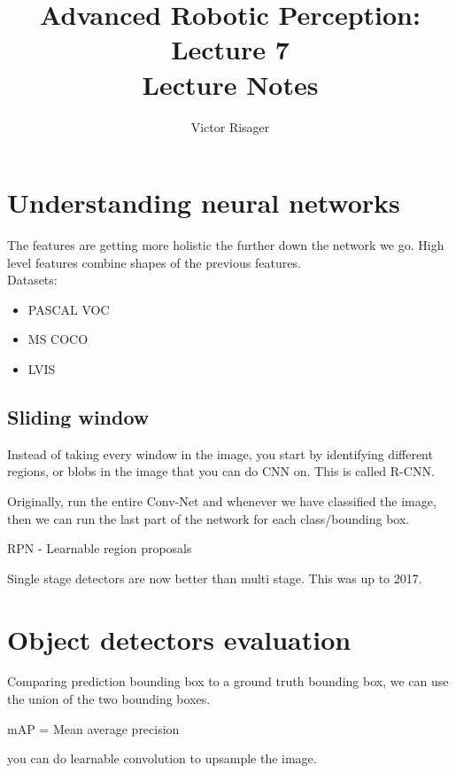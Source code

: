 \documentclass[a4paper]{article}
\title{Advanced Robotic Perception: Lecture 7 \\
	\large Lecture Notes}
\author{Victor Risager}
\begin{document}
\maketitle
\section{Understanding neural networks}
The features are getting more holistic the further down the network we go. High level features combine shapes of the previous features. \\
Datasets:
\begin{itemize}
	\item PASCAL VOC
	\item MS COCO 
	\item LVIS
\end{itemize}

\subsection{Sliding window}
Instead of taking every window in the image, you start by identifying different regions, or blobs in the image that you can do CNN on.
This is called R-CNN.

Originally, run the entire Conv-Net and whenever we have classified the image, then we can run the last part of the network for each class/bounding box. 

RPN - Learnable region proposals


Single stage detectors are now better than multi stage.  This was up to 2017.

\section{Object detectors evaluation}
Comparing prediction bounding box to a ground truth bounding box, we can use the union of the two bounding boxes. 


mAP = Mean average precision




you can do learnable convolution to upsample the image. 
\end{document}
